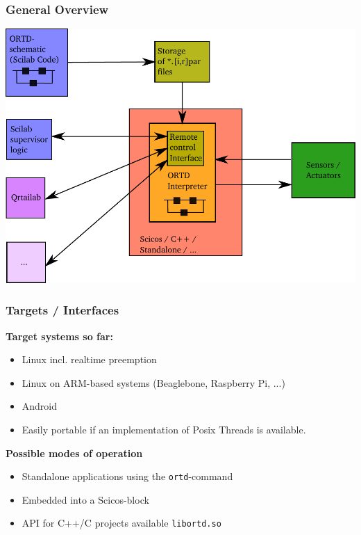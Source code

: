 \documentclass[serif,9pt,xcolor=dvipsnames]{beamer}
\begin{document}
\begin{frame}

 \frametitle{General Overview}



\includegraphics[trim=0mm 0mm 0mm 0mm, clip,width=0.95\linewidth]{../pictures/ortd_principle.pdf}

\end{frame}


\begin{frame}
\frametitle{Targets / Interfaces}

\textbf{Target systems so far:}
\begin{itemize}
 \item Linux incl. realtime preemption
 \item Linux on ARM-based systems (Beaglebone, Raspberry Pi, ...)
 \item Android
 \item Easily portable if an implementation of Posix Threads is available.
\end{itemize}


\textbf{Possible modes of operation}
  \begin{itemize}
   \item Standalone applications using the \texttt{ortd}-command
   \item Embedded into a Scicos-block
   \item API for C++/C projects available { \texttt{libortd.so} }
  \end{itemize}

\end{frame}
\end{document}
